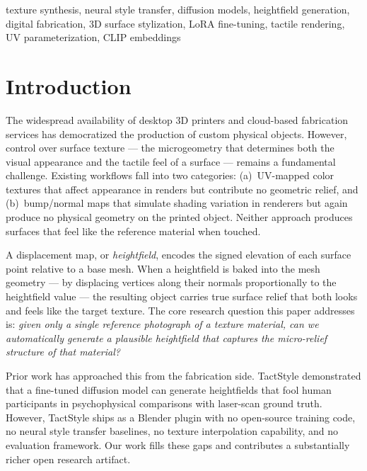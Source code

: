 \documentclass[conference]{IEEEtran}
\begin{document}
\begin{IEEEkeywords}
texture synthesis, neural style transfer, diffusion models, heightfield
generation, digital fabrication, 3D surface stylization, LoRA fine-tuning,
tactile rendering, UV parameterization, CLIP embeddings
\end{IEEEkeywords}

\section{Introduction}

The widespread availability of desktop 3D printers and cloud-based fabrication
services has democratized the production of custom physical objects. However,
control over surface texture — the microgeometry that determines both the visual
appearance and the tactile feel of a surface — remains a fundamental challenge.
Existing workflows fall into two categories: (a)~UV-mapped color textures that
affect appearance in renders but contribute no geometric relief, and
(b)~bump/normal maps that simulate shading variation in renderers but again
produce no physical geometry on the printed object. Neither approach produces
surfaces that feel like the reference material when touched.

A displacement map, or \emph{heightfield}, encodes the signed elevation of
each surface point relative to a base mesh. When a heightfield is baked into
the mesh geometry — by displacing vertices along their normals proportionally
to the heightfield value — the resulting object carries true surface relief
that both looks and feels like the target texture. The core research question
this paper addresses is: \emph{given only a single reference photograph of a
texture material, can we automatically generate a plausible heightfield that
captures the micro-relief structure of that material?}

Prior work has approached this from the fabrication side. TactStyle
\cite{b1} demonstrated that a fine-tuned diffusion model can generate
heightfields that fool human participants in psychophysical comparisons with
laser-scan ground truth. However, TactStyle ships as a Blender plugin with
no open-source training code, no neural style transfer baselines, no texture
interpolation capability, and no evaluation framework. Our work fills these
gaps and contributes a substantially richer open research artifact.
\end{document}
